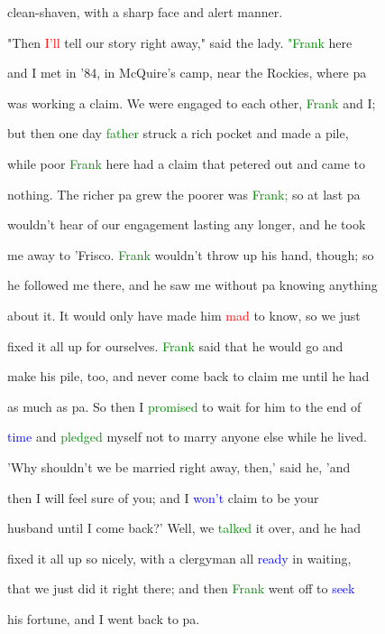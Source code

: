  clean-shaven, with a sharp face and alert manner.



 "Then \textcolor{red}{I'll} tell our story right away," said the lady. \textcolor{green}{"Frank} here

 and I met in '84, in McQuire's camp, near the Rockies, where pa

 was working a claim. We were engaged to each other, \textcolor{green}{Frank} and I;

 but then one day \textcolor{green}{father} struck a rich pocket and made a pile,

 while poor \textcolor{green}{Frank} here had a claim that petered out and came to

 nothing. The richer pa \textcolor{BurntOrange}{grew} the poorer was \textcolor{green}{Frank;} so at last pa

 wouldn't hear of our engagement lasting any longer, and he took

 me away to 'Frisco. \textcolor{green}{Frank} wouldn't throw up his hand, though; so

 he followed me there, and he saw me without pa knowing anything

 about it. It would only have made him \textcolor{red}{mad} to know, so we just

 fixed it all up for ourselves. \textcolor{green}{Frank} said that he would go and

 make his pile, too, and never come back to claim me until he had

 as much as pa. So then I \textcolor{green}{promised} to \textcolor{BurntOrange}{wait} for him to the end of

 \textcolor{blue}{time} and \textcolor{green}{pledged} myself not to \textcolor{BurntOrange}{marry} anyone else while he lived.

 'Why shouldn't we be married right away, then,' said he, 'and

 then I will feel sure of you; and I \textcolor{blue}{won't} claim to be your

 husband until I come back?' Well, we \textcolor{green}{talked} it over, and he had

 fixed it all up so nicely, with a clergyman all \textcolor{blue}{ready} in \textcolor{BurntOrange}{waiting,}

 that we just did it right there; and then \textcolor{green}{Frank} went off to \textcolor{blue}{seek}

 his \textcolor{BurntOrange}{fortune,} and I went back to pa.



